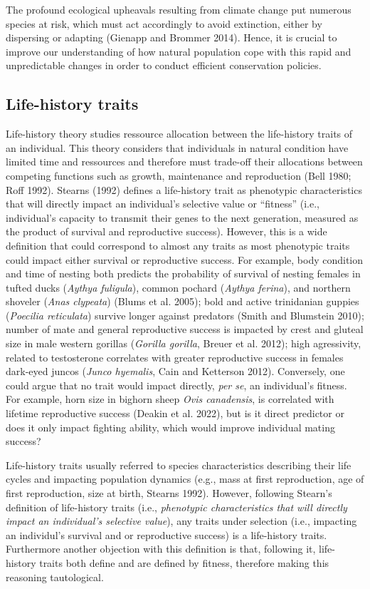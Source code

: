 \documentclass[
  12pt,
  letterpaper,
]{scrartcl}
\begin{document}
The profound ecological upheavals resulting from climate change put
numerous species at risk, which must act accordingly to avoid
extinction, either by dispersing or adapting (Gienapp and Brommer 2014).
Hence, it is crucial to improve our understanding of how natural
population cope with this rapid and unpredictable changes in order to
conduct efficient conservation policies.

\subsection{Life-history traits}\label{life-history-traits}

Life-history theory studies ressource allocation between the
life-history traits of an individual. This theory considers that
individuals in natural condition have limited time and ressources and
therefore must trade-off their allocations between competing functions
such as growth, maintenance and reproduction (Bell 1980; Roff 1992).
Stearns (1992) defines a life-history trait as phenotypic
characteristics that will directly impact an individual's selective
value or ``fitness'' (i.e., individual's capacity to transmit their
genes to the next generation, measured as the product of survival and
reproductive success). However, this is a wide definition that could
correspond to almost any traits as most phenotypic traits could impact
either survival or reproductive success. For example, body condition and
time of nesting both predicts the probability of survival of nesting
females in tufted ducks (\emph{Aythya fuligula}), common pochard
(\emph{Aythya ferina}), and northern shoveler (\emph{Anas clypeata})
(Blums et al. 2005); bold and active trinidanian guppies (\emph{Poecilia
reticulata}) survive longer against predators (Smith and Blumstein
2010); number of mate and general reproductive success is impacted by
crest and gluteal size in male western gorillas (\emph{Gorilla gorilla},
Breuer et al. 2012); high agressivity, related to testosterone
correlates with greater reproductive success in females dark-eyed juncos
(\emph{Junco hyemalis}, Cain and Ketterson 2012). Conversely, one could
argue that no trait would impact directly, \emph{per se}, an
individual's fitness. For example, horn size in bighorn sheep \emph{Ovis
canadensis}, is correlated with lifetime reproductive success (Deakin et
al. 2022), but is it direct predictor or does it only impact fighting
ability, which would improve individual mating success?

Life-history traits usually referred to species characteristics
describing their life cycles and impacting population dynamics (e.g.,
mass at first reproduction, age of first reproduction, size at birth,
Stearns 1992). However, following Stearn's definition of life-history
traits (i.e., \emph{phenotypic characteristics that will directly impact
an individual's selective value}), any traits under selection (i.e.,
impacting an individul's survival and or reproductive success) is a
life-history traits. Furthermore another objection with this definition
is that, following it, life-history traits both define and are defined
by fitness, therefore making this reasoning tautological.
\end{document}
